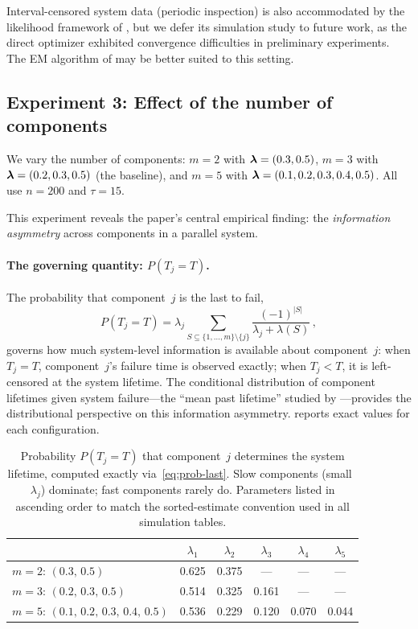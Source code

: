 Interval-censored system data (periodic inspection) is also
accommodated by the likelihood framework of ,
but we defer its simulation study to future work, as the direct
optimizer exhibited convergence difficulties in preliminary
experiments.  The EM algorithm of  may be
better suited to this setting.


\subsection{Experiment 3: Effect of the number of components}
\label{sec:sim-components}

We vary the number of components: $m = 2$ with $\boldsymbol{\lambda} = (0.3, 0.5)$,
$m = 3$ with $\boldsymbol{\lambda} = (0.2, 0.3, 0.5)$ (the baseline), and $m = 5$
with $\boldsymbol{\lambda} = (0.1, 0.2, 0.3, 0.4, 0.5)$.  All use $n = 200$ and
$\tau = 15$.

This experiment reveals the paper's central empirical finding: the
\emph{information asymmetry} across components in a parallel system.

\paragraph{The governing quantity: $P(T_j = T)$.}
The probability that component~$j$ is the last to fail,
\begin{equation}
\label{eq:prob-last-sim}
  P(T_j = T)
    = \lambda_j \sum_{S \subseteq \{1,\ldots,m\}\setminus\{j\}}
      \frac{(-1)^{|S|}}{\lambda_j + \lambda(S)}\,,
\end{equation}
governs how much system-level information is available
about component~$j$: when $T_j = T$, component~$j$'s failure time is
observed exactly; when $T_j < T$, it is left-censored at the system
lifetime.  The conditional distribution of component lifetimes given
system failure---the ``mean past lifetime'' studied by
\citet{Asadi2006}---provides the distributional perspective on this
information asymmetry.   reports exact values for each
configuration.

\begin{table}[t]
\centering
\caption{%
  Probability $P(T_j = T)$ that component~$j$ determines the system
  lifetime, computed exactly via~\eqref{eq:prob-last}.
  Slow components (small~$\lambda_j$) dominate; fast components rarely do.
  Parameters listed in ascending order to match the sorted-estimate
  convention used in all simulation tables.
}
\label{tab:prob-last}
\small
\begin{tabular}{l ccccc}
\toprule
& $\lambda_1$ & $\lambda_2$ & $\lambda_3$ & $\lambda_4$ & $\lambda_5$ \\
\midrule
$m = 2$: $(0.3,\, 0.5)$
  & 0.625 & 0.375 & --- & --- & --- \\
$m = 3$: $(0.2,\, 0.3,\, 0.5)$
  & 0.514 & 0.325 & 0.161 & --- & --- \\
$m = 5$: $(0.1,\, 0.2,\, 0.3,\, 0.4,\, 0.5)$
  & 0.536 & 0.229 & 0.120 & 0.070 & 0.044 \\
\bottomrule
\end{tabular}
\end{table}

